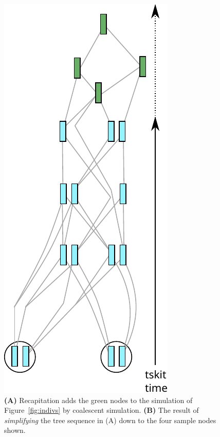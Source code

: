 \documentclass[12pt]{article}
\begin{document}
\begin{figure}
    \includegraphics{figures/pedigree_simplify}
\caption{
    \textbf{(A)} Recapitation adds the green nodes 
    to the simulation of Figure~\ref{fig:indivs} by coalescent simulation.
    \textbf{(B)} The result of \emph{simplifying} the tree sequence in (A)
    down to the four sample nodes shown.
}
\label{fig:recap_simp}
\end{figure}
\end{document}
